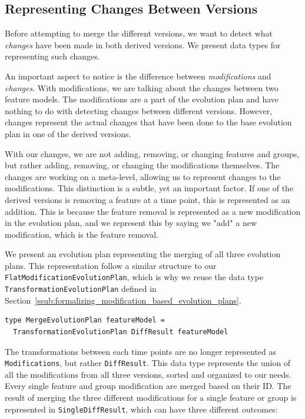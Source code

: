 \documentclass[a4paper,english]{ifimaster}
\begin{document}
\subsection{Representing Changes Between Versions}%
\label{sub:representing_changes_between_versions}

Before attempting to merge the different versions, we want to detect what \textit{changes} have been made in both derived versions. We present data types for representing such changes.

An important aspect to notice is the difference between \textit{modifications} and \textit{changes}. With modifications, we are talking about the changes between two feature models. The modifications are a part of the evolution plan and have nothing to do with detecting changes between different versions. However, changes represent the actual changes that have been done to the base evolution plan in one of the derived versions.

With our changes, we are not adding, removing, or changing features and groups, but rather adding, removing, or changing the modifications themselves. The changes are working on a meta-level, allowing us to represent changes to the modifications. This distinction is a subtle, yet an important factor. If one of the derived versions is removing a feature at a time point, this is represented as an addition. This is because the feature removal is represented as a new modification in the evolution plan, and we represent this by saying we "add" a new modification, which is the feature removal.

We present an evolution plan representing the merging of all three evolution plans. This representation follow a similar structure to our \texttt{Flat\-Modification\-Evolution\-Plan}, which is why we reuse the data type \texttt{Transformation\-Evolution\-Plan} defined in Section~\vref{ssub:formalizing_modification_based_evolution_plans}.

\begin{verbatim}
type MergeEvolutionPlan featureModel = 
  TransformationEvolutionPlan DiffResult featureModel
\end{verbatim}

The transformations between each time points are no longer represented as \texttt{Modifications}, but rather \texttt{DiffResult}. This data type represents the union of all the modifications from all three versions, sorted and organized to our needs. Every single feature and group modification are merged based on their ID. The result of merging the three different modifications for a single feature or group is represented in \texttt{SingleDiffResult}, which can have three different outcomes:
\end{document}
